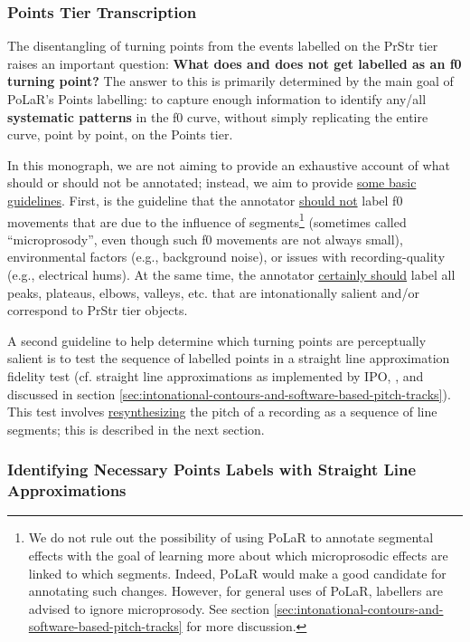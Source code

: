 \documentclass[11pt, twoside]{memoir}
\begin{document}
\subsubsection{Points Tier Transcription}\label{sec:points-tier-transcription}

The disentangling of turning points from the events labelled on the PrStr tier raises an important question: \textbf{What does and does not get labelled as an f0 turning point?} The answer to this is primarily determined by the main goal of PoLaR’s Points labelling: to capture enough information to identify any\slash all \textbf{systematic patterns} in the f0 curve, without simply replicating the entire curve, point by point, on the Points tier.

In this monograph, we are not aiming to provide an exhaustive account of what should or should not be annotated; instead, we aim to provide \uline{some basic guidelines}. First, is the guideline that the annotator \uline{should not} label f0 movements that are due to the influence of segments\footnote{We do not rule out the possibility of using PoLaR to annotate segmental effects with the goal of learning more about which microprosodic effects are linked to which segments. Indeed, PoLaR would make a good candidate for annotating such changes. However, for general uses of PoLaR, labellers are advised to ignore microprosody. See section \ref{sec:intonational-contours-and-software-based-pitch-tracks} for more discussion.} (sometimes called “microprosody”, even though such f0 movements are not always small), environmental factors (e.g., background noise), or issues with recording-quality (e.g., electrical hums). At the same time, the annotator \uline{certainly should} label all peaks, plateaus, elbows, valleys, etc. that are intonationally salient and/or correspond to PrStr tier objects.

A second guideline to help determine which turning points are perceptually salient is to test the sequence of labelled points in a straight line approximation fidelity test (cf. straight line approximations as implemented by IPO, \citealt{t-hart-90}, and discussed in section \ref{sec:intonational-contours-and-software-based-pitch-tracks}). This test involves \uline{resynthesizing} the pitch of a recording as a sequence of line segments; this is described in the next section.

\subsubsection{Identifying Necessary Points Labels with Straight Line Approximations}\label{sec:identifying-necessary-points-labels-with-straight-line-approximations}
\end{document}

